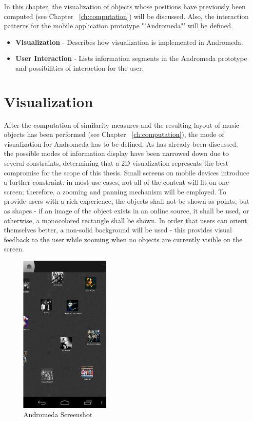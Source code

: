 In this chapter, the visualization of objects whose positions have previously been computed (see Chapter ~\ref{ch:computation}) will be discussed. Also, the interaction patterns for the mobile application prototype "'Andromeda"' will be defined.

\begin{itemize}
	\item \textbf {Visualization} - Describes how visualization is implemented in Andromeda.
	\item \textbf {User Interaction} - Lists information segments in the Andromeda prototype and possibilities of interaction for the user.
\end{itemize}

\section{Visualization}

After the computation of similarity measures and the resulting layout of music objects has been performed (see Chapter ~\ref{ch:computation}), the mode of visualization for Andromeda has to be defined. As has already been discussed, the possible modes of information display have been narrowed down due to several constraints, determining that a 2D visualization represents the best compromise for the scope of this thesis. Small screens on mobile devices introduce a further constraint: in most use cases, not all of the content will fit on one screen; therefore, a zooming and panning mechanism will be employed. To provide users with a rich experience, the objects shall not be shown as points, but as shapes - if an image of the object exists in an online source, it shall be used, or otherwise, a monocolored rectangle shall be shown. In order that users can orient themselves better, a non-solid background will be used - this provides visual feedback to the user while zooming when no objects are currently visible on the screen.

\begin{figure}[H]
  \centering
    \includegraphics[width=0.4\textwidth]{figures/screen_mds_10_after_all_uncollided_nodes}
  \caption{Andromeda Screenshot}
  \label{fig:prototype_screenshot}
\end{figure}

